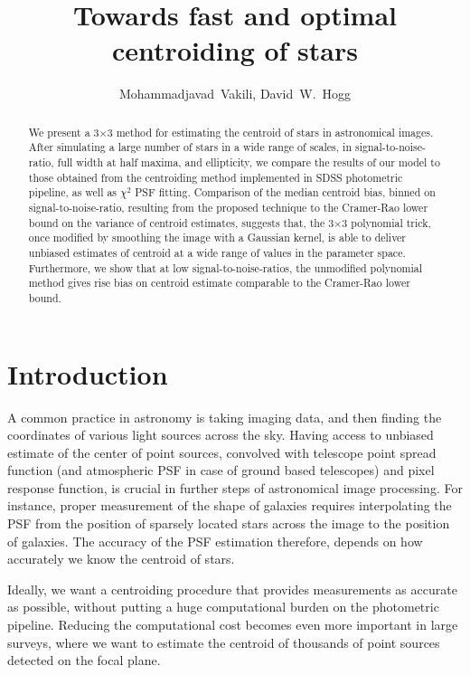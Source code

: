 \documentclass[12pt, preprint]{aastex}
\begin{document}
\author{
  Mohammadjavad~Vakili,
  David~W.~Hogg
}

\title{Towards fast and optimal centroiding of stars}

\begin{abstract}

We present a 3$\times$3 method for estimating the centroid of stars in astronomical images. After simulating a large number of stars in a wide range of scales, in signal-to-noise-ratio, full width at half maxima, and ellipticity, we compare the results of our model to those obtained from the centroiding method implemented in
SDSS photometric pipeline, as well as $\chi^{2}$ PSF fitting. Comparison of the median centroid bias, binned on signal-to-noise-ratio, resulting from the proposed technique to the Cramer-Rao lower bound on the variance of centroid estimates, suggests that, the 3$\times$3 polynomial trick, once modified by smoothing the image with a Gaussian kernel, is able to deliver unbiased estimates of centroid at a wide range of values in the parameter space. Furthermore, we show that at low signal-to-noise-ratios, the unmodified polynomial method gives rise bias on centroid estimate comparable to the Cramer-Rao lower bound. 

\end{abstract}

\section{Introduction}

A common practice in astronomy is taking imaging data, and then finding the coordinates of various light sources across the sky. Having access to unbiased estimate of the center of point sources, convolved with telescope point spread function (and atmospheric PSF in case of ground based telescopes) and pixel response function, is crucial in further steps of astronomical image processing. For instance, proper measurement of the shape of galaxies requires interpolating the PSF from the position of sparsely located stars across the image to the position of galaxies. The accuracy of the PSF estimation therefore, depends on how accurately we know the centroid of stars.

Ideally, we want a centroiding procedure that provides measurements as accurate as possible, without putting a huge computational burden on the photometric pipeline. Reducing the computational cost becomes even more important in large surveys, where we want to estimate the centroid of thousands of point sources detected on the focal plane. 
\end{document}
